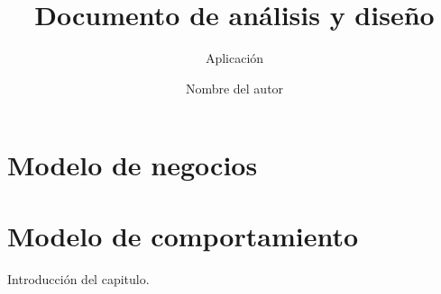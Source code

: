 \documentclass[oneside,10pt]{book}
\title{Documento de análisis y diseño}
\subtitle{Aplicación}
\author{Nombre del autor}
\begin{document}
\maketitle
\frontmatter
\tableofcontents
\mainmatter
\chapter{Modelo de negocios}
\newpage
\chapter{Modelo de comportamiento}
Introducción del capitulo. 

\end{document}
